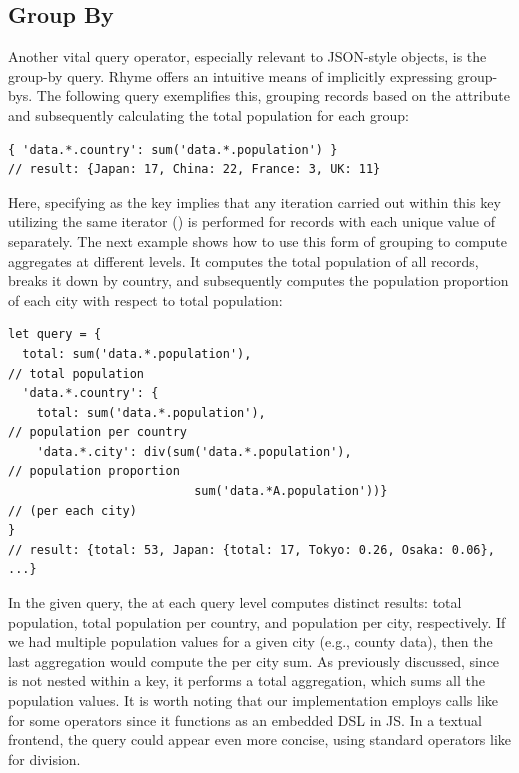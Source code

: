 \documentclass[runningheads]{llncs}
\newcommand{\lang}{Rhyme}
\begin{document}
\vspace{-3mm}
\subsection{Group By}\label{subsec:groupby}
\vspace{-2mm}
Another vital query operator, especially relevant to JSON-style objects,
is the group-by query.
\lang{} offers an intuitive means of implicitly expressing group-bys.
The following query exemplifies this, grouping records based on the
 attribute and subsequently calculating the total population
for each group:

\begin{lstlisting}[style=JavaScript, columns=flexible, numbers=none]
{ 'data.*.country': sum('data.*.population') }
// result: {Japan: 17, China: 22, France: 3, UK: 11}
\end{lstlisting}

Here, specifying  as the key implies
that any iteration carried out within this key utilizing the same
iterator (\inline{*}) is performed for records with each unique value of 
separately.
The next example shows how to use this form of grouping to compute aggregates at different
levels.
It computes the total population of all records, breaks it down by country,
and subsequently computes the population proportion of each city with respect to total
population:

\begin{lstlisting}[style=JavaScript, columns=flexible, numbers=none]
let query = { 
  total: sum('data.*.population'),                                    // total population
  'data.*.country': {
    total: sum('data.*.population'),                                  // population per country
    'data.*.city': div(sum('data.*.population'),                      // population proportion
                          sum('data.*A.population'))}                 // (per each city)
}
// result: {total: 53, Japan: {total: 17, Tokyo: 0.26, Osaka: 0.06}, ...}
\end{lstlisting}

In the given query, the  at each query level computes
distinct results: total population, total population per country, and population per city,
respectively. 
If we had multiple population values for a given city (e.g., county data), then the
last aggregation would compute the per city sum.
As previously discussed, since  is not nested within a
 key, it performs a total aggregation, which sums all the population values.
It is worth noting that our implementation employs calls like  for some operators
since it functions as an embedded DSL in JS.
In a textual frontend, the query could appear even more concise, using standard operators 
like \inline{/} for division.
\end{document}

